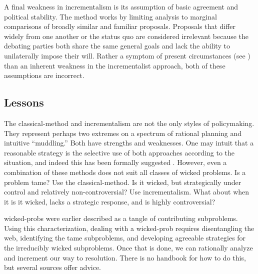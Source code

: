 A final weakness in \ac{incrementalism} is its assumption of basic agreement and political stability. The method works
by limiting analysis to marginal comparisons of broadly similar and familiar proposals. Proposals that differ widely
from one another or the status quo are considered irrelevant because the debating parties both share the same general
goals and lack the ability to unilaterally impose their will. Rather a symptom of present circumstances (see
) than an inherent weakness in the incrementalist approach, both of these assumptions are
incorrect.


\subsection{Lessons}
\label{sec-policy-lessons}

The \ac{classical-method} and \ac{incrementalism} are not the only styles of policymaking. They represent perhaps two
extremes on a spectrum of rational planning and intuitive ``muddling.'' Both have strengths and weaknesses. One may
intuit that a reasonable strategy is the selective use of both approaches according to the situation, and indeed this
has been formally suggested \cite{etzioni_scanning_1967}. However, even a combination of these methods does not suit all
classes of wicked problems. Is a problem tame? Use the \ac{classical-method}. Is it wicked, but strategically under
control and relatively non-controversial? Use \ac{incrementalism}. What about when it is it wicked, lacks a strategic
response, and is highly controversial?

\Acp{wicked-prob} were earlier described as a tangle of contributing subproblems. Using this characterization, dealing
with a \ac{wicked-prob} requires disentangling the web, identifying the tame subproblems, and developing agreeable
strategies for the irreducibly wicked subproblems. Once that is done, we can rationally analyze and increment our way to
resolution. There is no handbook for how to do this, but several sources offer advice.

\newcommand{\wickedtipsstart}{\begin{itemize}}
\newcommand{\wickedtip}[2]{ %
  \item \textbf{#1} \nopagebreak

  \vspace{0.5\baselineskip} \parbox{\linewidth}{#2} \vspace{0.5\baselineskip}
}
\newcommand{\wickedtipsend}{\end{itemize}}

